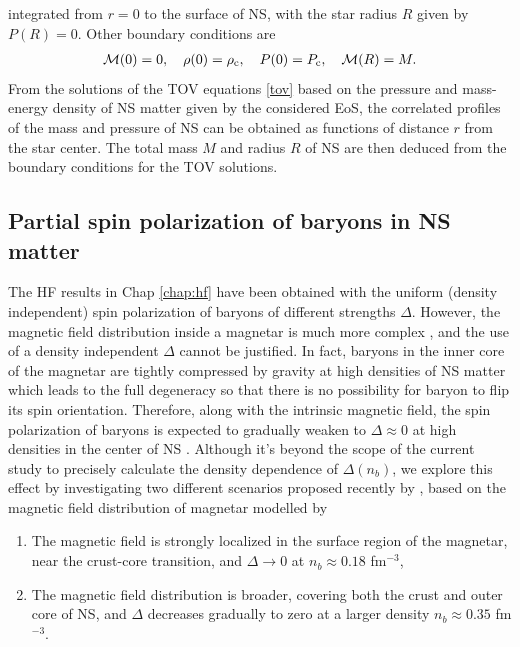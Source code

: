 integrated from $r=0$ to the surface of NS, with the star radius $R$ given by 
$P(R)=0$. Other boundary conditions are 
\begin{align}
\mathcal{M}(0)=0, \quad \rho(0)=\rho_{\rm c}, \quad P(0)=P_{\rm c},\quad \mathcal{M}(R)=M.   
\label{Bdr}
\end{align}
From the solutions of the \gls{TOV} equations \eqref{tov} based on the pressure and mass-energy
density of \gls{NS} matter given by the considered \gls{EoS}, the correlated profiles of the mass 
and pressure of \gls{NS} can be obtained as functions of distance $r$ from the star center. 
The total mass $M$ and radius $R$ of \gls{NS} are then deduced from the boundary conditions 
for the \gls{TOV} solutions.

\subsection*{Partial spin polarization of baryons in NS matter}
The \gls{HF} results in Chap \ref{chap:hf} have been obtained with the uniform (density independent)  
spin polarization of baryons of different strengths $\Delta$. However, the magnetic 
field distribution inside a magnetar is much more complex \citep{fujisawa2014magnetic}, 
and the use of a density independent $\Delta$ cannot be justified. In fact, baryons in the 
inner core of the magnetar are tightly compressed by gravity at high densities of \gls{NS} matter
which leads to the full degeneracy so that there is no possibility for baryon to flip 
its spin orientation. Therefore, along with the intrinsic magnetic field, the spin 
polarization of baryons is expected to gradually weaken to $\Delta \approx 0$ at high
densities in the center of \gls{NS} \citep{fujisawa2014magnetic,tan2020spin}. Although it's beyond 
the scope of the current study to precisely calculate the density dependence of $\Delta(n_b)$, 
we explore this effect by investigating two different scenarios proposed recently by
\cite{tan2020spin}, based on the magnetic field distribution of magnetar modelled by 
\cite{fujisawa2014magnetic}
\begin{enumerate}[label=(\Alph*)]
    \item The magnetic field is strongly localized in the surface region of the magnetar, 
		near the crust-core transition, and $\Delta\to 0$ at $n_b\approx 0.18$ fm$^{-3}$,
    \item The magnetic field distribution is broader, covering both the crust and outer 
        core of \gls{NS}, and $\Delta$ decreases gradually to zero at a larger density 
		$n_b \approx 0.35$ fm$^{-3}$. 
\end{enumerate}
